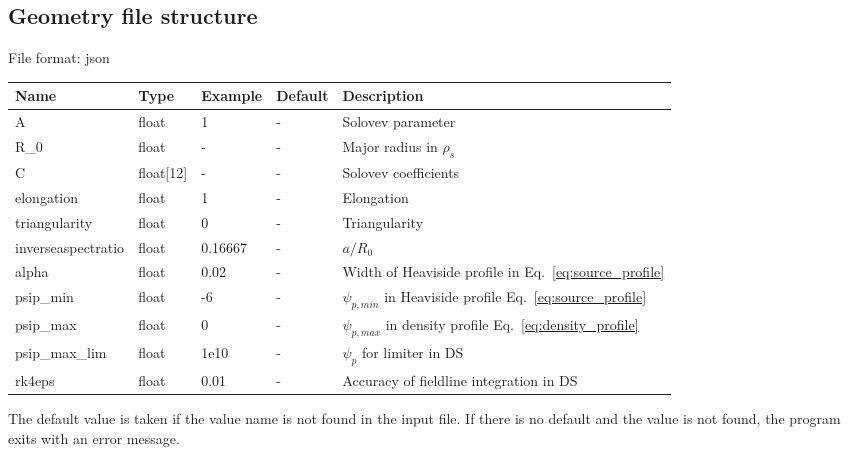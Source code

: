 \subsection{Geometry file structure}
File format: json

\begin{longtable}{llll>{\RaggedRight}p{7cm}}
\toprule
\rowcolor{gray!50}\textbf{Name} &  \textbf{Type} & \textbf{Example} & \textbf{Default} & \textbf{Description}  \\ \midrule
    A      & float & 1 &  - & Solovev parameter \\
    R\_0   & float & - & -  & Major radius in $\rho_s$ \\
    C      & float[12] &  - & - & Solovev coefficients \\
    elongation & float & 1 & - & Elongation \\
    triangularity & float & 0 & - & Triangularity \\
    inverseaspectratio & float & 0.16667 & - & $a/R_0$ \\
    alpha  & float & 0.02 & - & Width of Heaviside profile in Eq.~\eqref{eq:source_profile} \\
    psip\_min & float & -6 & - & $\psi_{p,min}$ in Heaviside profile Eq.~\eqref{eq:source_profile} \\
    psip\_max & float & 0 & - & $\psi_{p,max}$ in density profile Eq.~\eqref{eq:density_profile} \\
    psip\_max\_lim & float & 1e10 & - & $\psi_p$ for limiter in DS \\
    rk4eps & float & 0.01 & - & Accuracy of fieldline integration in DS \\
\bottomrule
\end{longtable}
The default value is taken if the value name is not found in the input file. If there is no default and
the value is not found,
the program exits with an error message.






